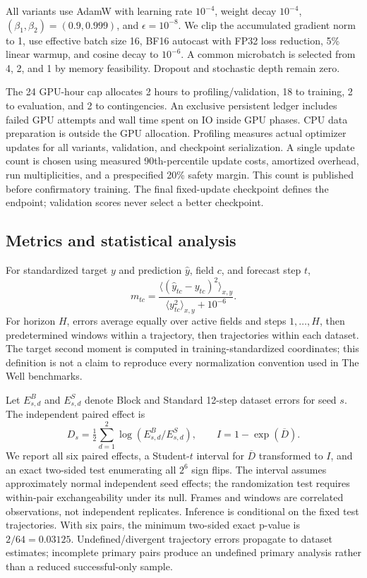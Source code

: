 All variants use AdamW with learning rate $10^{-4}$, weight decay $10^{-4}$, $(\beta_1,\beta_2)=(0.9,0.999)$, and $\epsilon=10^{-8}$. We clip the accumulated gradient norm to 1, use effective batch size 16, BF16 autocast with FP32 loss reduction, 5\% linear warmup, and cosine decay to $10^{-6}$. A common microbatch is selected from 4, 2, and 1 by memory feasibility. Dropout and stochastic depth remain zero.

The 24 GPU-hour cap allocates 2 hours to profiling/validation, 18 to training, 2 to evaluation, and 2 to contingencies. An exclusive persistent ledger includes failed GPU attempts and wall time spent on IO inside GPU phases. CPU data preparation is outside the GPU allocation. Profiling measures actual optimizer updates for all variants, validation, and checkpoint serialization. A single update count is chosen using measured 90th-percentile update costs, amortized overhead, run multiplicities, and a prespecified 20\% safety margin. This count is published before confirmatory training. The final fixed-update checkpoint defines the endpoint; validation scores never select a better checkpoint.

\subsection{Metrics and statistical analysis}
For standardized target $y$ and prediction $\hat y$, field $c$, and forecast step $t$,
\begin{equation}
 m_{tc}=\frac{\langle(\hat y_{tc}-y_{tc})^2\rangle_{x,y}}{\langle y_{tc}^2\rangle_{x,y}+10^{-6}}.
\end{equation}
For horizon $H$, errors average equally over active fields and steps $1,\ldots,H$, then predetermined windows within a trajectory, then trajectories within each dataset. The target second moment is computed in training-standardized coordinates; this definition is not a claim to reproduce every normalization convention used in The Well benchmarks.

Let $E_{s,d}^{B}$ and $E_{s,d}^{S}$ denote Block and Standard 12-step dataset errors for seed $s$. The independent paired effect is
\begin{equation}
D_s=\tfrac12\sum_{d=1}^{2}\log(E_{s,d}^{B}/E_{s,d}^{S}),\qquad I=1-\exp(\overline D).
\end{equation}
We report all six paired effects, a Student-$t$ interval for $\overline D$ transformed to $I$, and an exact two-sided test enumerating all $2^6$ sign flips. The interval assumes approximately normal independent seed effects; the randomization test requires within-pair exchangeability under its null. Frames and windows are correlated observations, not independent replicates. Inference is conditional on the fixed test trajectories. With six pairs, the minimum two-sided exact p-value is $2/64=0.03125$. Undefined/divergent trajectory errors propagate to dataset estimates; incomplete primary pairs produce an undefined primary analysis rather than a reduced successful-only sample.

